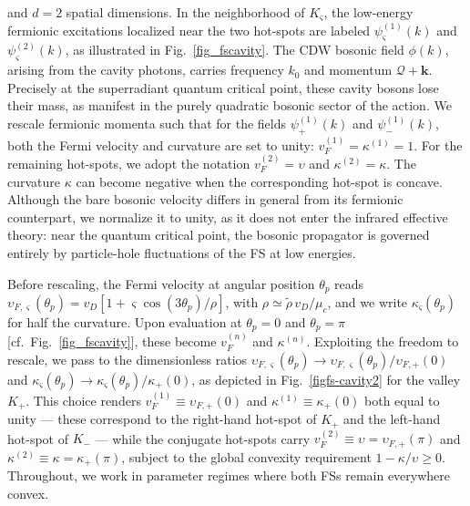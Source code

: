 and $d = 2$ spatial dimensions. In the neighborhood of $K_\varsigma$, 
the low-energy fermionic excitations localized near the two hot-spots 
are labeled $\psi_\varsigma^{(1)}(k)$ and $\psi_\varsigma^{(2)}(k)$, 
as illustrated in Fig.~\ref{fig_fscavity}. The CDW bosonic field 
$\phi(k)$, arising from the cavity photons, carries frequency $k_0$ 
and momentum $\boldsymbol{\mathcal{Q}} + \boldsymbol{k}$. Precisely 
at the superradiant quantum critical point, these cavity bosons lose 
their mass, as manifest in the purely quadratic bosonic sector of the 
action. We rescale fermionic momenta such that for the fields 
$\psi_+^{(1)}(k)$ and $\psi_-^{(1)}(k)$, both the Fermi velocity and 
curvature are set to unity: $v_F^{(1)} = \kappa^{(1)} = 1$. For the 
remaining hot-spots, we adopt the notation $v_F^{(2)} = \upsilon$ and 
$\kappa^{(2)} = \kappa$. The curvature $\kappa$ can become negative 
when the corresponding hot-spot is concave. Although the bare bosonic 
velocity differs in general from its fermionic counterpart, we normalize 
it to unity, as it does not enter the infrared effective theory: near 
the quantum critical point, the bosonic propagator is governed entirely 
by particle-hole fluctuations of the FS at low energies.

Before rescaling, the Fermi velocity at angular position $\theta_p$ 
reads $\upsilon_{F,\varsigma}(\theta_p) = v_D\left[1 + 
\varsigma\cos(3\theta_p)/\rho\right]$, with $\rho \simeq \tilde{\rho}\,
v_D/\mu_c$, and we write $\kappa_\varsigma(\theta_p)$ for half the 
curvature. Upon evaluation at $\theta_p = 0$ and $\theta_p = \pi$ 
[cf.\ Fig.~\ref{fig_fscavity}], these become $v_F^{(n)}$ and 
$\kappa^{(n)}$. Exploiting the freedom to rescale, we pass to the 
dimensionless ratios $\upsilon_{F,\varsigma}(\theta_p) \rightarrow 
\upsilon_{F,\varsigma}(\theta_p)/\upsilon_{F,+}(0)$ and 
$\kappa_\varsigma(\theta_p) \rightarrow \kappa_\varsigma(\theta_p)/
\kappa_+(0)$, as depicted in Fig.~\ref{figfs-cavity2} for the valley 
$K_+$. This choice renders $v_F^{(1)} \equiv \upsilon_{F,+}(0)$ and 
$\kappa^{(1)} \equiv \kappa_+(0)$ both equal to unity --- these 
correspond to the right-hand hot-spot of $K_+$ and the left-hand 
hot-spot of $K_-$ --- while the conjugate hot-spots carry 
$v_F^{(2)} \equiv \upsilon = \upsilon_{F,+}(\pi)$ and 
$\kappa^{(2)} \equiv \kappa = \kappa_+(\pi)$, subject to the global 
convexity requirement $1 - \kappa/\upsilon \geq 0$. Throughout, we 
work in parameter regimes where both FSs remain everywhere convex.


